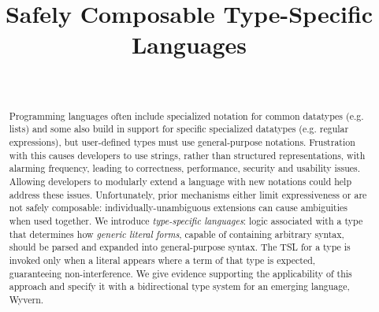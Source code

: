 \documentclass[runningheads]{llncs}
\begin{document}
\title{Safely Composable Type-Specific Languages}
\author{~}
\institute{~}

\maketitle

\begin{abstract}
Programming languages often include specialized notation for common datatypes (e.g. lists) and some also build in support for specific specialized datatypes (e.g. regular expressions), but user-defined types must use general-purpose notations. Frustration with this causes developers to use strings, rather than structured representations, with alarming frequency, leading to correctness, performance, security and usability  issues.
Allowing developers to modularly extend a language with new notations could help address these issues. Unfortunately, prior mechanisms either limit expressiveness or are not safely composable: individually-unambiguous extensions can cause ambiguities when used together. We introduce \emph{type-specific languages}:  logic associated with a type that determines how \emph{generic literal forms}, capable of containing arbitrary syntax, should be parsed and expanded into general-purpose syntax. The TSL for a type is invoked only when a literal appears where a term of that type is expected, guaranteeing non-interference. We give evidence supporting the applicability of  this approach and specify it with a bidirectional type system for an emerging language, Wyvern.
%
%

\end{abstract}
\end{document}
